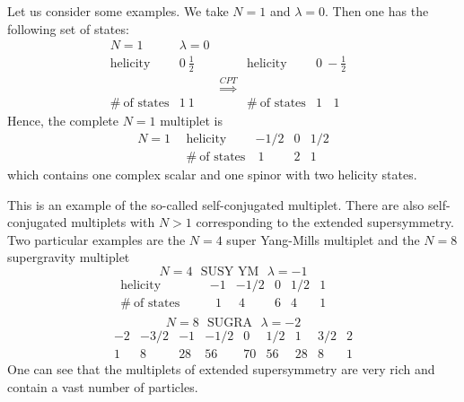 \documentclass{cernyrep}
\begin{document}
Let us consider some examples. We take $N=1$ and $\lambda=0$.
Then one has the following set of states:
\begin{equation*}
\begin{array}{lllllc}
N=1 & \lambda=0 & & & & \\
\mbox{helicity} & 0 \ \frac12 & & \mbox{helicity} & 0 \ -\frac 12 \\
& & \stackrel{CPT}{\Longrightarrow} & & \\
\# \ \mbox{of states} & 1 \ 1 & & \# \ \mbox{of states} & 1 \ \ \ \ 1
\end{array}
\end{equation*}
Hence, the complete $N=1$ multiplet is
\begin{equation*}
\begin{array}{llccc} N=1 \ \ &
\mbox{helicity}&-1/2&0&1/2  \\ &
\# \ \mbox{of states}&\ 1& 2&1
\end{array}
\end{equation*}
which contains one complex scalar and one spinor with two
helicity states.

This is an example of the so-called self-conjugated multiplet.
There are also self-con\-ju\-gated multiplets with $N>1$
corresponding to the extended supersymmetry. Two particular
examples are the $N=4$ super Yang-Mills multiplet and the $N=8$
supergravity multiplet
\begin{equation*}
N=4 \ \ \
\mbox{SUSY YM} \  \ \  \lambda=-1
\end{equation*}
\begin{equation*}
\begin{array}{cccccccccc}
\mbox{helicity}&& &-1&-1/2&0&1/2&1 &&  \\
\# \ \mbox{of states}&&&\ \ 1&\ 4&6 & 4 & 1 &&\\
\end{array}
\end{equation*}
\begin{equation*}
N=8  \ \ \  \mbox{SUGRA} \ \ \   \lambda=-2
\end{equation*}
\begin{equation*}
\begin{array}{ccccccccc}
-2&-3/2&-1&-1/2&0&1/2&1&3/2&2 \\
 1&8&28 & 56 & 70 &56&28&  8& 1
\end{array}
\end{equation*}
One can see that the multiplets of extended supersymmetry
are very rich and contain a vast number of particles.
\end{document}
